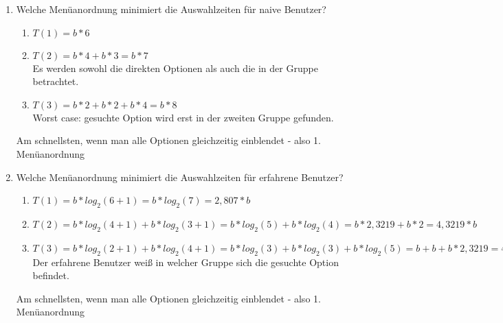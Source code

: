 \documentclass[a4paper,10pt]{article}
\begin{document}
\begin{enumerate}

\item Welche Menüanordnung minimiert die Auswahlzeiten für naive Benutzer?\\
\begin{enumerate}
\item $T(1) = b * 6$ \\
\item $T(2) = b * 4 + b * 3 = b * 7$ \\
Es werden sowohl die direkten Optionen als auch die in der Gruppe betrachtet.\\
\item $T(3) = b * 2 + b * 2 + b * 4 = b * 8$ \\
Worst case: gesuchte Option wird erst in der zweiten Gruppe gefunden. \\
\end{enumerate}
Am schnellsten, wenn man alle Optionen gleichzeitig einblendet - also 1. Menüanordnung
\item Welche Menüanordnung minimiert die Auswahlzeiten für erfahrene Benutzer? \\
\begin{enumerate}
\item $T(1) = b * log_2(6 + 1) = b * log_2(7) = 2,807 * b$ \\
\item $T(2) = b * log_2(4 + 1) + b * log_2(3 + 1) = b * log_2(5) + b * log_2(4) = b * 2,3219 + b * 2 = 4,3219 * b$ \\
\item $T(3) = b * log_2(2 + 1) + b * log_2(4 + 1) = b * log_2(3) + b * log_2(3) + b * log_2(5) = b + b + b * 2,3219 = 4,3219 * b$ \\
Der erfahrene Benutzer weiß in welcher Gruppe sich die gesuchte Option befindet.
\end{enumerate}
Am schnellsten, wenn man alle Optionen gleichzeitig einblendet - also 1. Menüanordnung
\end{enumerate}
\end{document}
